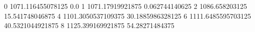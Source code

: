 0 1071.116455078125 0.0
1 1071.17919921875 0.062744140625
2 1086.658203125 15.541748046875
4 1101.3050537109375 30.1885986328125
6 1111.6485595703125 40.5321044921875
8 1125.399169921875 54.28271484375
